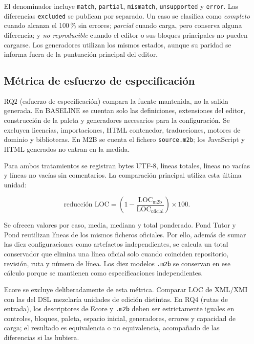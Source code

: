 El denominador incluye \texttt{match}, \texttt{partial}, \texttt{mismatch},
\texttt{unsupported} y \texttt{error}. Las diferencias \texttt{excluded} se
publican por separado. Un caso se clasifica como \emph{completo} cuando alcanza
el 100\,\% sin errores; \emph{parcial} cuando carga, pero conserva alguna
diferencia; y \emph{no reproducible} cuando el editor o sus bloques principales
no pueden cargarse. Los generadores utilizan los mismos estados, aunque su
paridad se informa fuera de la puntuación principal del editor.

\subsection{Métrica de esfuerzo de especificación}

RQ2 (esfuerzo de especificación) compara la fuente mantenida, no la salida
generada. En BASELINE se cuentan
solo las definiciones, extensiones del editor, construcción de la paleta y
generadores necesarios para la configuración. Se excluyen licencias, importaciones,
HTML contenedor, traducciones, motores de dominio y bibliotecas. En M2B se cuenta
el fichero \texttt{source.m2b}; los JavaScript y HTML generados no entran en la
medida.

Para ambos tratamientos se registran bytes UTF-8, líneas totales, líneas no
vacías y líneas no vacías sin comentarios. La comparación principal utiliza
esta última unidad:

\begin{equation}
  \text{reducción LOC} =
  \left(1 - \frac{\text{LOC}_{\mathrm{m2b}}}
                    {\text{LOC}_{\mathrm{oficial}}}\right) \times 100.
  \label{eq:reduccion-loc}
\end{equation}

Se ofrecen valores por caso, media, mediana y total ponderado. Pond Tutor y Pond
reutilizan líneas de los mismos ficheros oficiales. Por ello, además de sumar
las diez configuraciones como artefactos independientes, se calcula un total
conservador que elimina una línea oficial solo cuando coinciden repositorio,
revisión, ruta y número de línea. Los diez modelos \texttt{.m2b} se conservan en
ese cálculo porque se mantienen como especificaciones independientes.

Ecore se excluye deliberadamente de esta métrica. Comparar LOC de XML/XMI con
las del DSL mezclaría unidades de edición distintas. En RQ4 (rutas de entrada), los descriptores de
Ecore y \texttt{.m2b} deben ser estrictamente iguales en controles, bloques,
paleta, espacio inicial, generadores, errores y capacidad de carga; el resultado
es equivalencia o no equivalencia, acompañado de las diferencias si las hubiera.

